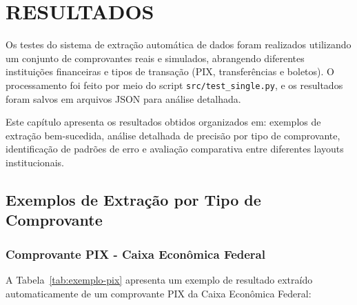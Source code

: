 
\chapter{RESULTADOS}
\label{chap:resultados}

Os testes do sistema de extração automática de dados foram realizados utilizando um conjunto de comprovantes reais e simulados, abrangendo diferentes instituições financeiras e tipos de transação (PIX, transferências e boletos). O processamento foi feito por meio do script \texttt{src/test\_single.py}, e os resultados foram salvos em arquivos JSON para análise detalhada.

Este capítulo apresenta os resultados obtidos organizados em: exemplos de extração bem-sucedida, análise detalhada de precisão por tipo de comprovante, identificação de padrões de erro e avaliação comparativa entre diferentes layouts institucionais.

\section{Exemplos de Extração por Tipo de Comprovante}

\subsection{Comprovante PIX - Caixa Econômica Federal}

A Tabela~\ref{tab:exemplo-pix} apresenta um exemplo de resultado extraído automaticamente de um comprovante PIX da Caixa Econômica Federal:

